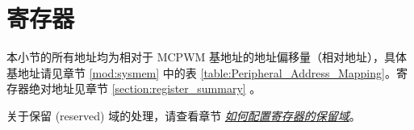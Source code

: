 \documentclass[main\_\_CN.tex]{subfiles}
\begin{document}
\section{寄存器}

本小节的所有地址均为相对于 MCPWM 基地址的地址偏移量（相对地址），具体基地址请见章节 \ref{mod:sysmem} \textit{} 中的表 \ref{table:Peripheral_Address_Mapping}。寄存器绝对地址见章节 \ref{section:register_summary} \textit{}。

关于保留 (reserved) 域的处理，请查看章节 \hyperref[programming-reserved-field]{\textit{如何配置寄存器的保留域}}。


\end{document}
